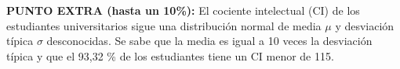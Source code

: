 \documentclass[addpoints,spanish, 12pt,a4paper]{exam}
\begin{document}
\begin{questions}
\question \textbf{PUNTO EXTRA (hasta un 10\%):} El cociente intelectual (CI) de los estudiantes universitarios sigue una distribución
normal de media $\mu$ y desviación típica $\sigma$ desconocidas. Se sabe que la media es
igual a 10 veces la desviación típica y que el 93,32 \% de los estudiantes tiene un CI
menor de 115.

        


\end{questions}
\end{document}
